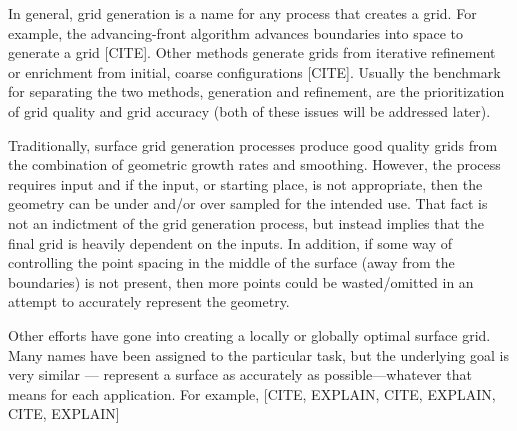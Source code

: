 In general, grid generation is a name for any process that creates a
grid. For example, the advancing-front algorithm advances boundaries
into space to generate a grid \cite{tristrano98, diaz-morcillo98}[CITE].
Other methods generate grids from iterative refinement or enrichment
from initial, coarse configurations \cite{marcum98, marcum00,
shewchuk02}[CITE]. Usually the benchmark for separating the two
methods, generation and refinement, are the prioritization of grid
quality and grid accuracy (both of these issues will be addressed
later).

Traditionally, surface grid generation processes produce good quality
grids from the combination of geometric growth rates and smoothing.
However, the process requires input and if the input, or starting place,
is not appropriate, then the geometry can be under and/or over sampled
for the intended use. That fact is not an indictment of the grid
generation process, but instead implies that the final grid is heavily
dependent on the inputs. In addition, if some way of controlling the
point spacing in the middle of the surface (away from the boundaries) is
not present, then more points could be wasted/omitted in an attempt to
accurately represent the geometry.

Other efforts have gone into creating a locally or globally optimal
surface grid. Many names have been assigned to the particular task, but
the underlying goal is very similar --- represent a surface as
accurately as possible---whatever that means for each application. For
example, [CITE, EXPLAIN, CITE, EXPLAIN, CITE, EXPLAIN]
